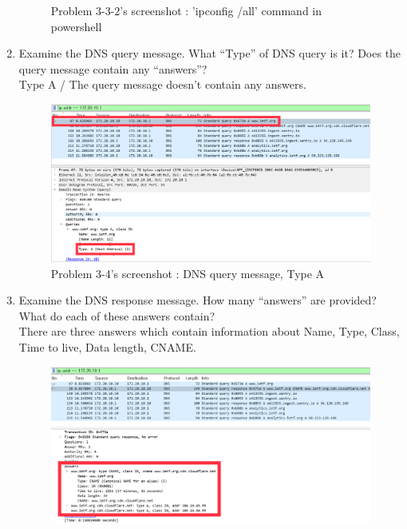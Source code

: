 \begin{enumerate}[label=\bfseries Problem \arabic*:,leftmargin=*,labelindent=1em]
\begin{figure}[!h]
        		\caption{\footnotesize Problem 3-3-2's screenshot : 'ipconfig /all' command in powershell}
        		\vspace{-10pt}
            \end{figure}
        \item Examine the DNS query message. What “Type” of DNS query is it? 
        Does the query message contain any “answers”?\\[0.2mm]
            \soln Type A / The query message doesn’t contain any answers.
            \vspace{-2mm}  
            \begin{figure}[!h]\centering
        		\includegraphics[width=.78\textwidth]{image/result_week01/Q3-4.png}
        		\caption{\footnotesize Problem 3-4's screenshot : DNS query message, Type A}
        		\vspace{-10pt}
            \end{figure}
        \item Examine the DNS response message. How many “answers” are provided? 
        What do each of these answers contain?\\[0.2mm]
            \soln There are three answers which contain information about Name, Type, Class, Time to live, Data length, CNAME.
             \vspace{-2mm}  
            \begin{figure}[!h]\centering
        		\includegraphics[width=.78\textwidth]{image/result_week01/Q3-5.png}

\end{figure}
\end{enumerate}
